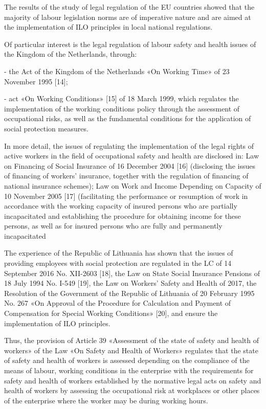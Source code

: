 \begin{multicols}{2}
The results of the study of legal regulation of the EU countries showed
that the majority of labour legislation norms are of imperative nature
and are aimed at the implementation of ILO principles in local national
regulations.

Of particular interest is the legal regulation of labour safety and
health issues of the Kingdom of the Netherlands, through:

- the Act of the Kingdom of the Netherlands «On Working Time» of 23
November 1995 {[}14{]};

- act «On Working Conditions» {[}15{]} of 18 March 1999, which regulates
the implementation of the working conditions policy through the
assessment of occupational risks, as well as the fundamental conditions
for the application of social protection measures.

In more detail, the issues of regulating the implementation of the legal
rights of active workers in the field of occupational safety and health
are disclosed in: Law on Financing of Social Insurance of 16 December
2004 {[}16{]} (disclosing the issues of financing of
workers'{} insurance, together with the regulation of
financing of national insurance schemes); Law on Work and Income
Depending on Capacity of 10 November 2005 {[}17{]} (facilitating the
performance or resumption of work in accordance with the working
capacity of insured persons who are partially incapacitated and
establishing the procedure for obtaining income for these persons, as
well as for insured persons who are fully and permanently incapacitated

The experience of the Republic of Lithuania has shown that the issues of
providing employees with social protection are regulated in the LC of 14
September 2016 No. XII-2603 {[}18{]}, the Law on State Social Insurance
Pensions of 18 July 1994 No. I-549 {[}19{]}, the Law on
Workers'{} Safety and Health of 2017, the Resolution of
the Government of the Republic of Lithuania of 20 February 1995 No. 267
«On Approval of the Procedure for Calculation and Payment of
Compensation for Special Working Conditions» {[}20{]}, and ensure the
implementation of ILO principles.

Thus, the provision of Article 39 «Assessment of the state of safety and
health of workers» of the Law «On Safety and Health of Workers»
regulates that the state of safety and health of workers is assessed
depending on the compliance of the means of labour, working conditions
in the enterprise with the requirements for safety and health of workers
established by the normative legal acts on safety and health of workers
by assessing the occupational risk at workplaces or other places of the
enterprise where the worker may be during working hours.


\end{multicols}
